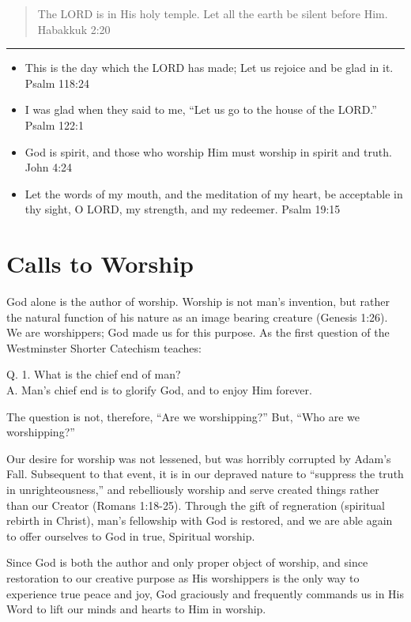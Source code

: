 \documentclass[]{book}
\begin{document}
\begin{quote}
The LORD is in His holy temple. Let all the earth be silent before Him.
\textbar{} Habakkuk 2:20
\end{quote}

\begin{center}\rule{0.5\linewidth}{\linethickness}\end{center}

\begin{itemize}
\item
  This is the day which the LORD has made; Let us rejoice and be glad in
  it. \textbar{} Psalm 118:24
\item
  I was glad when they said to me, ``Let us go to the house of the
  LORD.'' \textbar{} Psalm 122:1
\item
  God is spirit, and those who worship Him must worship in spirit and
  truth. \textbar{} John 4:24
\item
  Let the words of my mouth, and the meditation of my heart, be
  acceptable in thy sight, O LORD, my strength, and my redeemer.
  \textbar{} Psalm 19:15
\end{itemize}

\chapter{Calls to Worship}\label{calls-to-worship}

God alone is the author of worship. Worship is not man's invention, but
rather the natural function of his nature as an image bearing creature
(Genesis 1:26). We are worshippers; God made us for this purpose. As the
first question of the Westminster Shorter Catechism teaches:

Q. 1. What is the chief end of man?\\
A. Man's chief end is to glorify God, and to enjoy Him forever.

The question is not, therefore, ``Are we worshipping?'' But, ``Who are
we worshipping?''

Our desire for worship was not lessened, but was horribly corrupted by
Adam's Fall. Subsequent to that event, it is in our depraved nature to
``suppress the truth in unrighteousness,'' and rebelliously worship and
serve created things rather than our Creator (Romans 1:18-25). Through
the gift of regneration (spiritual rebirth in Christ), man's fellowship
with God is restored, and we are able again to offer ourselves to God in
true, Spiritual worship.

Since God is both the author and only proper object of worship, and
since restoration to our creative purpose as His worshippers is the only
way to experience true peace and joy, God graciously and frequently
commands us in His Word to lift our minds and hearts to Him in worship.
\end{document}

